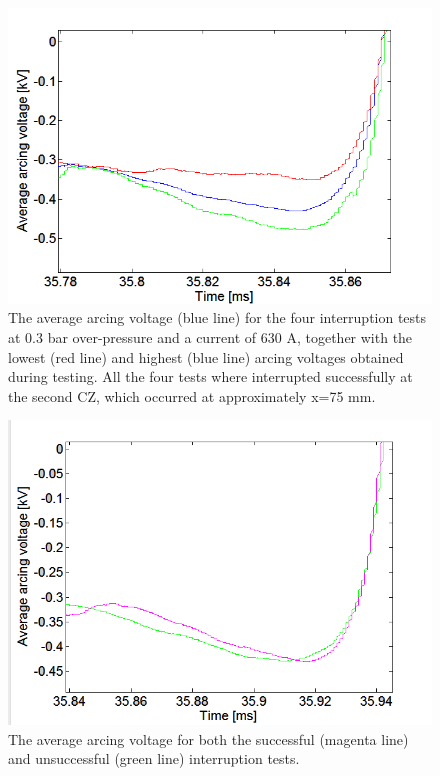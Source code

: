 \documentclass[10pt,b5paper,twoside]{article}
\begin{document}
\begin{figure}[H]
\centering
\includegraphics[scale=0.6, angle =0 ]{Bilder/Results/ArcingVoltage_75_none_reIgnition_average.PNG}
\caption{The average arcing voltage (blue line) for the four interruption tests at 0.3 bar over-pressure and a current of 630 A, together with the lowest (red line) and highest (blue line) arcing voltages obtained during testing. All the four tests where interrupted successfully at the second CZ, which occurred at approximately  x=75 mm.} \label{fig:75mmSuccessful_ave}
\end{figure}

\begin{figure}[H]
\centering
\includegraphics[scale=0.6, angle =0 ]{Bilder/Results/ArcingVoltage_75_both_average.PNG}
\caption{The average arcing voltage for both the successful (magenta line) and unsuccessful (green line) interruption tests.} \label{fig:75mm_both_ave}
\end{figure}
\end{document}

